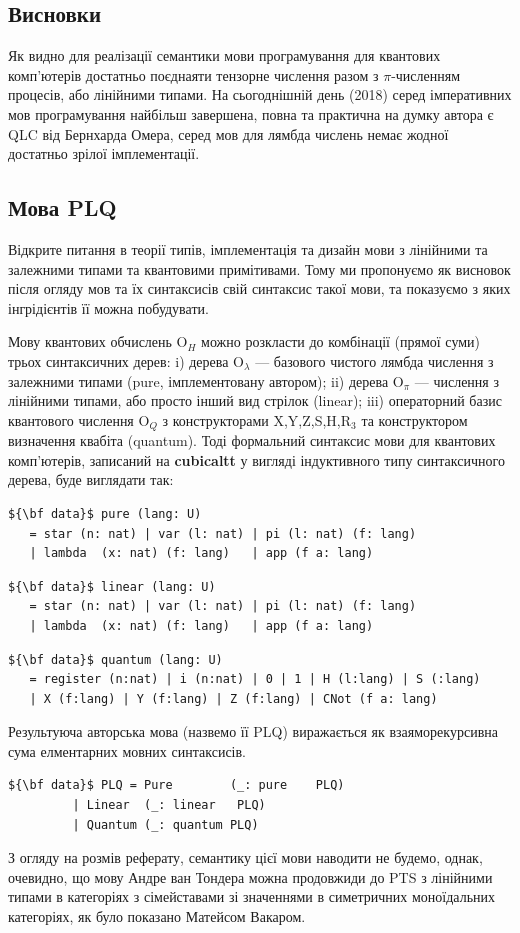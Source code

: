 \documentclass{article}
\theoremstyle{definition}
\begin{document}
\newpage
\subsection{Висновки}
Як видно для реалізації семантики мови програмування для квантових
комп'ютерів достатньо поєднаяти тензорне числення разом з $\pi$-численням процесів,
або лінійними типами. На сьогоднішній день (2018) серед імперативних мов програмування
найбільш завершена, повна та практична на думку автора є QLC від Бернхарда Омера, серед
мов для лямбда числень немає жодної достатньо зрілої імплементації.

\subsection{Мова PLQ}
Відкрите питання в теорії типів, імплементація та дизайн мови
з лінійними та залежними типами та квантовими примітивами.
Тому ми пропонуємо як висновок після огляду мов та їх синтаксисів свій синтаксис такої мови,
та показуємо з яких інгрідієнтів її можна побудувати.

Мову квантових обчислень O$_H$ можно розкласти до комбінації (прямої суми) трьох синтаксичних дерев:
  i) дерева O$_\lambda$ --- базового чистого лямбда числення з залежними типами (pure, імплементовану автором\cite{Tonpa18});
 ii) дерева O$_\pi$ --- числення з лінійними типами, або просто інший вид стрілок (linear);
iii) операторний базис квантового числення O$_Q$ з
     конструкторами X,Y,Z,S,H,R$_3$ та конструктором визначення квабіта (quantum).
Тоді формальний синтаксис мови для квантових комп'ютерів,
записаний на {\bf cubicaltt}\cite{Mortberg17} у вигляді індуктивного типу синтаксичного дерева,
буде виглядати так:
\begin{lstlisting}[mathescape=true]
${\bf data}$ pure (lang: U)
   = star (n: nat) | var (l: nat) | pi (l: nat) (f: lang)
   | lambda  (x: nat) (f: lang)   | app (f a: lang)
\end{lstlisting}
\begin{lstlisting}[mathescape=true]
${\bf data}$ linear (lang: U)
   = star (n: nat) | var (l: nat) | pi (l: nat) (f: lang)
   | lambda  (x: nat) (f: lang)   | app (f a: lang)
\end{lstlisting}
\begin{lstlisting}[mathescape=true]
${\bf data}$ quantum (lang: U)
   = register (n:nat) | i (n:nat) | 0 | 1 | H (l:lang) | S (:lang)
   | X (f:lang) | Y (f:lang) | Z (f:lang) | CNot (f a: lang)
\end{lstlisting}
Результуюча авторська мова (назвемо її PLQ) виражається
як взаяморекурсивна сума елментарних мовних синтаксисів.
\begin{lstlisting}[mathescape=true]
${\bf data}$ PLQ = Pure        (_: pure    PLQ)
         | Linear  (_: linear   PLQ)
         | Quantum (_: quantum PLQ)
\end{lstlisting}
З огляду на розмів реферату, семантику цієї мови наводити не будемо,
однак, очевидно, що мову Андре ван Тондера можна продовжиди до
PTS з лінійними типами в категоріях з сімейставами зі значеннями в симетричних моноїдальних категоріях,
як було показано Матейсом Вакаром\cite{Vakar2014}.
\newpage
\end{document}
